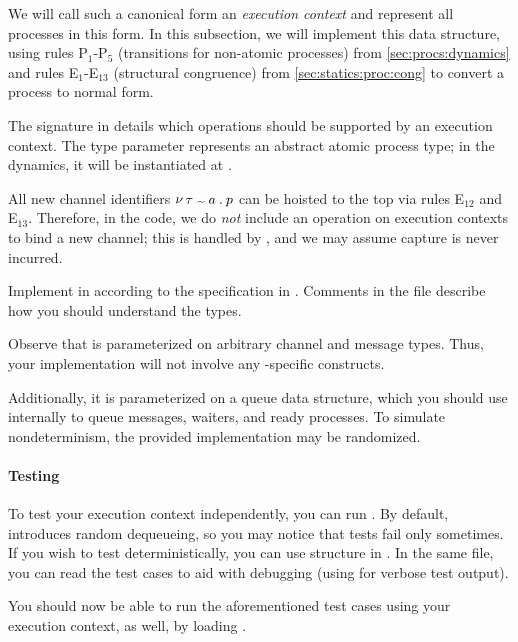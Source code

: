 \documentclass[11pt]{article}
\begin{document}
We will call such a canonical form an \emph{execution context} and represent all processes in this form.
In this subsection, we will implement this data structure, using rules P$_1$-P$_5$ (transitions for non-atomic processes) from \cref{sec:procs:dynamics} and rules E$_1$-E$_{13}$ (structural congruence) from \cref{sec:statics:proc:cong} to convert a process to normal form.

The signature in  details which operations should be supported by an execution context.
The type parameter  represents an abstract atomic process type; in the dynamics, it will be instantiated at .

All new channel identifiers $\tnewproccst{a}{\tau}{p}$ can be hoisted to the top via rules E$_{12}$ and E$_{13}$.
Therefore, in the code, we do \emph{not} include an operation on execution contexts to bind a new channel; this is handled by , and we may assume capture is never incurred.

Implement  in  according to the specification in .
Comments in the file describe how you should understand the types.

Observe that  is parameterized on arbitrary channel and message types.
Thus, your implementation will not involve any \LangCA{}-specific constructs.

Additionally, it is parameterized on a queue data structure, which you should use internally to queue messages, waiters, and ready processes.
To simulate nondeterminism, the provided implementation may be randomized.

\paragraph{Testing}
To test your execution context independently, you can run .
By default,  introduces random dequeueing, so you may notice that tests fail only sometimes.
If you wish to test deterministically, you can use structure  in .
In the same file, you can read the test cases to aid with debugging (using  for verbose test output).

You should now be able to run the aforementioned \LangCA{} test cases using your execution context, as well, by loading .
\end{document}
